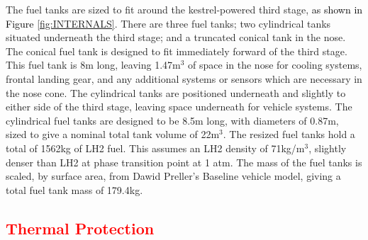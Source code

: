 		

		The fuel tanks are sized to fit around the kestrel-powered third stage, \textcolor{black}{as shown in Figure \ref{fig:INTERNALS}}. There are three fuel tanks; two cylindrical tanks situated underneath the third stage; and a truncated conical tank in the nose. The conical fuel tank is designed to fit immediately forward of the third stage. This fuel tank is 8m long, leaving 1.47m$^3$ of space in the nose for cooling systems, frontal landing gear, and any additional systems or sensors which are necessary in the nose cone. The cylindrical tanks are positioned underneath and slightly to either side of the third stage, leaving space underneath for vehicle systems. The cylindrical fuel tanks are designed to be 8.5m long, with diameters of 0.87m, sized to give a nominal total tank volume of 22m$^3$.
The resized fuel tanks hold a total of 1562kg of LH2 fuel. This assumes an LH2 density of 71kg/m$^3$, slightly denser than LH2 at phase transition point at 1 atm.
The mass of the fuel tanks is scaled, by surface area, from Dawid Preller's Baseline vehicle model\cite{Preller2017b}, giving a total fuel tank mass of 179.4kg.
		
		\textcolor{red}{
			\subsection{Thermal Protection}\label{sec:therm1}
				}
	
